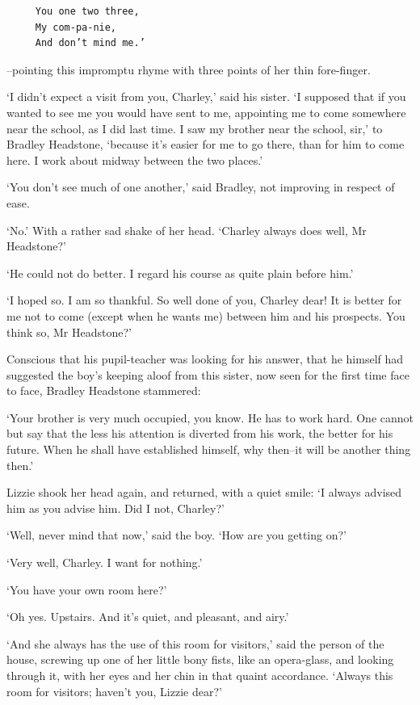 \begin{verbatim}
     You one two three,
     My com-pa-nie,
     And don’t mind me.’
\end{verbatim}

--pointing this impromptu rhyme with three points of her thin
fore-finger.

‘I didn’t expect a visit from you, Charley,’ said his sister. ‘I
supposed that if you wanted to see me you would have sent to me,
appointing me to come somewhere near the school, as I did last time.
I saw my brother near the school, sir,’ to Bradley Headstone, ‘because
it’s easier for me to go there, than for him to come here. I work about
midway between the two places.’

‘You don’t see much of one another,’ said Bradley, not improving in
respect of ease.

‘No.’ With a rather sad shake of her head. ‘Charley always does well, Mr
Headstone?’

‘He could not do better. I regard his course as quite plain before him.’

‘I hoped so. I am so thankful. So well done of you, Charley dear! It is
better for me not to come (except when he wants me) between him and his
prospects. You think so, Mr Headstone?’

Conscious that his pupil-teacher was looking for his answer, that he
himself had suggested the boy’s keeping aloof from this sister, now seen
for the first time face to face, Bradley Headstone stammered:

‘Your brother is very much occupied, you know. He has to work hard. One
cannot but say that the less his attention is diverted from his work,
the better for his future. When he shall have established himself, why
then--it will be another thing then.’

Lizzie shook her head again, and returned, with a quiet smile: ‘I always
advised him as you advise him. Did I not, Charley?’

‘Well, never mind that now,’ said the boy. ‘How are you getting on?’

‘Very well, Charley. I want for nothing.’

‘You have your own room here?’

‘Oh yes. Upstairs. And it’s quiet, and pleasant, and airy.’

‘And she always has the use of this room for visitors,’ said the
person of the house, screwing up one of her little bony fists, like an
opera-glass, and looking through it, with her eyes and her chin in that
quaint accordance. ‘Always this room for visitors; haven’t you, Lizzie
dear?’


